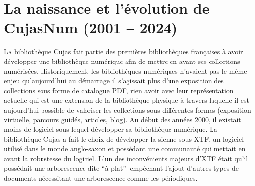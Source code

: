 \chapter{La naissance et l’évolution de CujasNum (2001 – 2024)}

\lettrine{L}a bibliothèque Cujas fait partie des premières bibliothèques françaises à avoir développer une bibliothèque numérique afin de mettre en avant ses collections numérisées. Historiquement, les bibliothèques numériques n'avaient pas le même enjeu qu'aujourd'hui au démarrage il s'agissait plus d'une exposition des collections sous forme de catalogue PDF, rien avoir avec leur représentation actuelle qui est une extension de la bibliothèque physique à travers laquelle il est aujourd'hui possible de valoriser les collections sous différentes formes (exposition virtuelle, parcours guidés, articles, blog). Au début des années 2000, il existait moins de logiciel sous lequel développer sa bibliothèque numérique. La bibliothèque Cujas a fait le choix de développer la sienne sous XTF, un logiciel utilisé dans le monde anglo-saxon et possédant une communauté qui mettait en avant la robustesse du logiciel. L'un des inconvénients majeurs d'XTF était qu'il possédait une arborescence dite \enquote{à plat}, empêchant l'ajout d'autres types de documents nécessitant une arborescence comme les périodiques.




